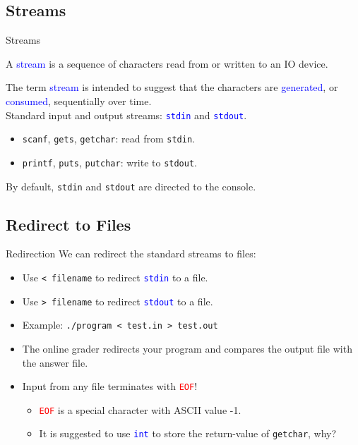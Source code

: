 \documentclass{beamer}
\newcommand{\red}[1]{\textcolor{red}{#1}}
\newcommand{\blue}[1]{\textcolor{blue}{#1}}
\newcommand{\ttt}[1]{\texttt{#1}}
\newcommand{\bluett}[1]{\blue{\ttt{#1}}}
\newcommand{\redtt}[1]{\red{\ttt{#1}}}
\theoremstyle{definition}
\begin{document}
\subsection{Streams}

\begin{frame}{Streams}
    \begin{definition}[Stream]
        A \blue{stream} is a sequence of characters read from or written to an IO device.
    \end{definition}
    The term \blue{stream} is intended to suggest that the characters are \blue{generated}, or \blue{consumed}, sequentially over time.\\
    \pause
    Standard input and output streams: \bluett{stdin} and \bluett{stdout}.
    \begin{itemize}
        \item \ttt{scanf}, \ttt{gets}, \ttt{getchar}: read from \ttt{stdin}.
        \item \ttt{printf}, \ttt{puts}, \ttt{putchar}: write to \ttt{stdout}.
    \end{itemize}
    By default, \ttt{stdin} and \ttt{stdout} are directed to the console.
\end{frame}

\subsection{Redirect to Files}

\begin{frame}{Redirection}
    We can redirect the standard streams to files:
    \begin{itemize}
        \item Use \ttt{< filename} to redirect \bluett{stdin} to a file.
        \item Use \ttt{> filename} to redirect \bluett{stdout} to a file.
        \pause
        \item Example: \ttt{./program < test.in > test.out}
        \item The online grader redirects your program and compares the output file with the answer file.
        \pause
        \item Input from any file terminates with \redtt{EOF}!
        \begin{itemize}
            \item \redtt{EOF} is a special character with ASCII value -1.
            \item It is suggested to use \bluett{int} to store the return-value of \ttt{getchar}, why?
        \end{itemize}
    \end{itemize}
\end{frame}
\end{document}
